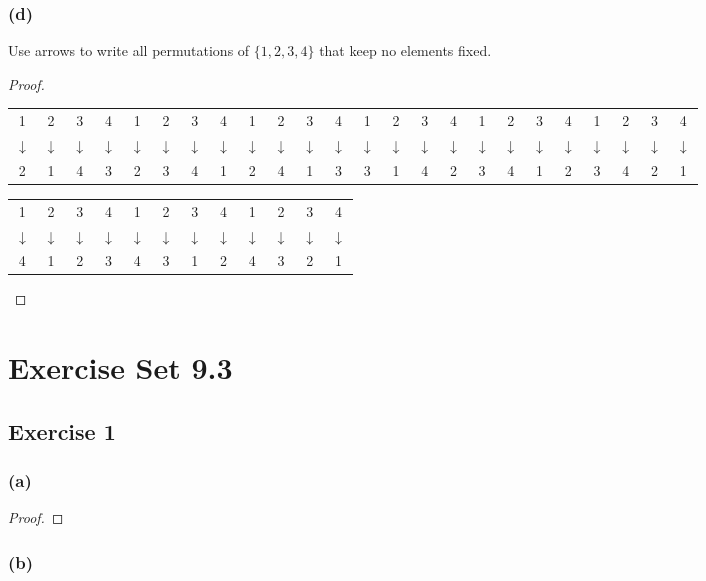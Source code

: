 \documentclass[14pt]{extarticle}
\newcommand{\cyda}{{\cy \(\downarrow\)}}
\newcommand{\cy}{\color{cyan}}
\begin{document}
\subsubsection{(d)}
Use arrows to write all permutations of \(\{1, 2, 3, 4\}\) that keep no elements fixed.

\begin{proof}
\begin{center}
\begin{tabular}{cccc|cccc|cccc|cccc|cccc|cccc}
1&2&3&4&1&2&3&4&1&2&3&4&1&2&3&4&1&2&3&4&1&2&3&4 \\
\cyda & \cyda & \cyda & \cyda & \cyda & \cyda & \cyda & \cyda & \cyda & \cyda & \cyda & \cyda & \cyda & \cyda & 
\cyda & \cyda & \cyda & \cyda & \cyda & \cyda & \cyda & \cyda & \cyda & \cyda \\
2&1&4&3&2&3&4&1&2&4&1&3&3&1&4&2&3&4&1&2&3&4&2&1
\end{tabular}
\end{center}
\begin{center}
\begin{tabular}{cccc|cccc|cccc}
1&2&3&4&1&2&3&4&1&2&3&4\\
\cyda & \cyda & \cyda & \cyda & \cyda & \cyda & \cyda & \cyda & \cyda & \cyda & \cyda & \cyda \\
4&1&2&3&4&3&1&2&4&3&2&1
\end{tabular}
\end{center}
\end{proof}

\section{Exercise Set 9.3}

\subsection{Exercise 1}

\subsubsection{(a)}

\begin{proof}

\end{proof}

\subsubsection{(b)}
\end{document}
